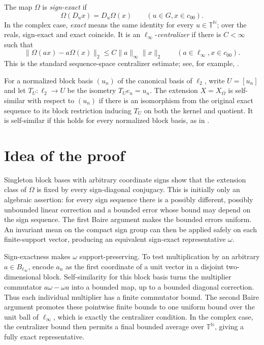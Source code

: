 \documentclass[11pt]{article}
\newcommand{\czz}{c_{00}}
\newcommand{\TT}{\mathbb T}
\newcommand{\Dop}[1]{D_{#1}}
\begin{document}
The map $\Omega$ is \emph{sign-exact} if
\[
 \Omega(\Dop u x)=\Dop u\Omega(x) \qquad (u\in G,x\in\czz).
\]
In the complex case, \emph{exact} means the same identity for every
$u\in\TT^{\mathbb N}$; over the reals, sign-exact and exact coincide.
It is an $\ell_\infty$-\emph{centralizer} if there is $C<\infty$ such that
\[
 \|\Omega(ax)-a\Omega(x)\|_2
 \le C\|a\|_\infty\|x\|_2
 \qquad(a\in\ell_\infty,x\in\czz).
\]
This is the standard sequence-space centralizer estimate; see, for example,
\cite[Sec.~3]{CG}.

For a normalized block basis $(u_n)$ of the canonical basis of $\ell_2$,
write $U=[u_n]$ and let $T_U:\ell_2\to U$ be the isometry
$T_Ue_n=u_n$.  The extension $X=X_\Omega$ is self-similar with respect to
$(u_n)$ if there is an isomorphism from the original exact sequence to its
block restriction inducing $T_U$ on both the kernel and quotient.  It is
self-similar if this holds for every normalized block basis, as in
\cite[Sec.~7]{CDR}.

\section*{Idea of the proof}

Singleton block bases with arbitrary coordinate signs show that the
extension class of $\Omega$ is fixed by every sign-diagonal conjugacy.  This is
initially only an algebraic assertion: for every sign sequence there is a
possibly different, possibly unbounded linear correction and a bounded error
whose bound may depend on the sign sequence.  The first Baire argument makes
the bounded errors uniform.  An invariant mean on the compact sign group
can then be applied safely on each finite-support vector, producing an
equivalent sign-exact representative $\omega$.

Sign-exactness makes $\omega$ support-preserving.  To test multiplication by an
arbitrary $a\in B_{\ell_\infty}$, encode $a_n$ as the first coordinate of a
unit vector in a disjoint two-dimensional block.  Self-similarity for this
block basis turns the multiplier commutator $a\omega-\omega a$ into a bounded
map, up to a bounded diagonal correction.  Thus each individual multiplier
has a finite commutator bound.  The second Baire argument promotes these
pointwise finite bounds to one uniform bound over the unit ball of
$\ell_\infty$, which is exactly the centralizer condition.  In the complex
case, the centralizer bound then permits a final bounded average over
$\TT^{\mathbb N}$, giving a fully exact representative.
\end{document}
